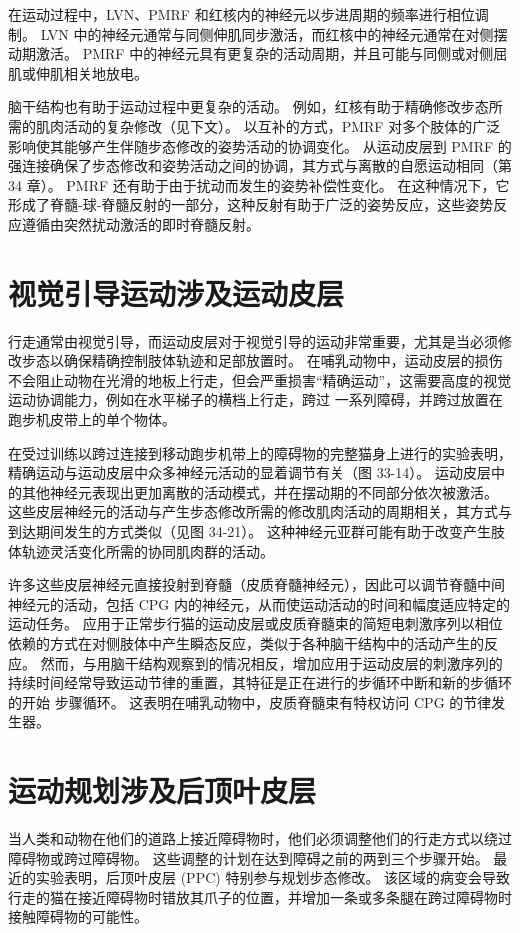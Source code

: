 在运动过程中，LVN、PMRF 和红核内的神经元以步进周期的频率进行相位调制。 LVN 中的神经元通常与同侧伸肌同步激活，而红核中的神经元通常在对侧摆动期激活。 PMRF 中的神经元具有更复杂的活动周期，并且可能与同侧或对侧屈肌或伸肌相关地放电。

脑干结构也有助于运动过程中更复杂的活动。 例如，红核有助于精确修改步态所需的肌肉活动的复杂修改（见下文）。 以互补的方式，PMRF 对多个肢体的广泛影响使其能够产生伴随步态修改的姿势活动的协调变化。 从运动皮层到 PMRF 的强连接确保了步态修改和姿势活动之间的协调，其方式与离散的自愿运动相同（第 34 章）。 PMRF 还有助于由于扰动而发生的姿势补偿性变化。 在这种情况下，它形成了脊髓-球-脊髓反射的一部分，这种反射有助于广泛的姿势反应，这些姿势反应遵循由突然扰动激活的即时脊髓反射。


\section{视觉引导运动涉及运动皮层}

行走通常由视觉引导，而运动皮层对于视觉引导的运动非常重要，尤其是当必须修改步态以确保精确控制肢体轨迹和足部放置时。 在哺乳动物中，运动皮层的损伤不会阻止动物在光滑的地板上行走，但会严重损害“精确运动”，这需要高度的视觉运动协调能力，例如在水平梯子的横档上行走，跨过 一系列障碍，并跨过放置在跑步机皮带上的单个物体。

在受过训练以跨过连接到移动跑步机带上的障碍物的完整猫身上进行的实验表明，精确运动与运动皮层中众多神经元活动的显着调节有关（图 33-14）。 运动皮层中的其他神经元表现出更加离散的活动模式，并在摆动期的不同部分依次被激活。 这些皮层神经元的活动与产生步态修改所需的修改肌肉活动的周期相关，其方式与到达期间发生的方式类似（见图 34-21）。 这种神经元亚群可能有助于改变产生肢体轨迹灵活变化所需的协同肌肉群的活动。

许多这些皮层神经元直接投射到脊髓（皮质脊髓神经元），因此可以调节脊髓中间神经元的活动，包括 CPG 内的神经元，从而使运动活动的时间和幅度适应特定的运动任务。 应用于正常步行猫的运动皮层或皮质脊髓束的简短电刺激序列以相位依赖的方式在对侧肢体中产生瞬态反应，类似于各种脑干结构中的活动产生的反应。 然而，与用脑干结构观察到的情况相反，增加应用于运动皮层的刺激序列的持续时间经常导致运动节律的重置，其特征是正在进行的步循环中断和新的步循环的开始 步骤循环。 这表明在哺乳动物中，皮质脊髓束有特权访问 CPG 的节律发生器。

\section{运动规划涉及后顶叶皮层}
当人类和动物在他们的道路上接近障碍物时，他们必须调整他们的行走方式以绕过障碍物或跨过障碍物。 这些调整的计划在达到障碍之前的两到三个步骤开始。 最近的实验表明，后顶叶皮层 (PPC) 特别参与规划步态修改。 该区域的病变会导致行走的猫在接近障碍物时错放其爪子的位置，并增加一条或多条腿在跨过障碍物时接触障碍物的可能性。

